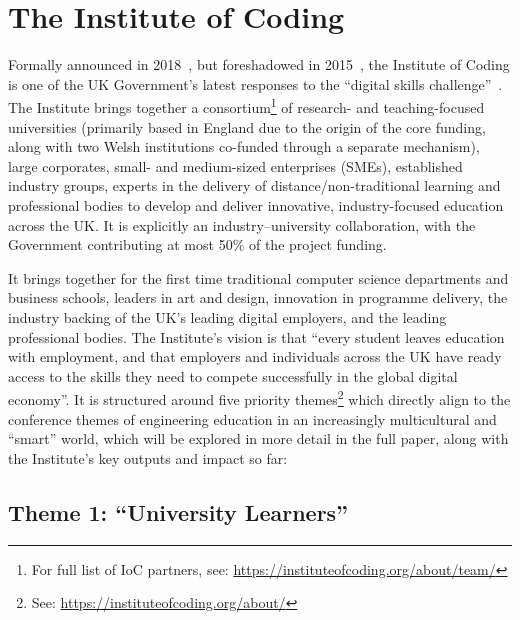 \documentclass[conference]{IEEEtran}
\begin{document}
\section{The Institute of Coding}\label{ioc}


Formally announced in 2018~\cite{DfE2018a}, but foreshadowed in
2015~\cite{HMG2015a}, the Institute of Coding is one of the UK
Government's latest responses to the ``digital skills
challenge''~\cite{davenport-et-al:cep2019}. The Institute brings
together a consortium\footnote{For full list of IoC partners, see:
\url{https://instituteofcoding.org/about/team/}} of research- and
teaching-focused universities (primarily based in England due to the
origin of the core funding, along with two Welsh institutions
co-funded through a separate mechanism), large corporates, small- and
medium-sized enterprises (SMEs), established industry groups, experts
in the delivery of distance/non-traditional learning and professional
bodies to develop and deliver innovative, industry-focused education
across the UK. It is explicitly an industry--university collaboration,
with the Government contributing at most 50\% of the project funding.

It brings together for the first time traditional computer science
departments and business schools, leaders in art and design,
innovation in programme delivery, the industry backing of the UK's
leading digital employers, and the leading professional bodies.  The
Institute's vision is that ``every student leaves education with
employment, and that employers and individuals across the UK have
ready access to the skills they need to compete successfully in the
global digital economy''. It is structured around five priority
themes\footnote{See: \url{https://instituteofcoding.org/about/}}
which directly align to the conference themes of engineering education
in an increasingly multicultural and ``smart'' world, which will be
explored in more detail in the full paper, along with the Institute's
key outputs and impact so far:

\subsection*{Theme 1: ``University Learners''}
\end{document}
